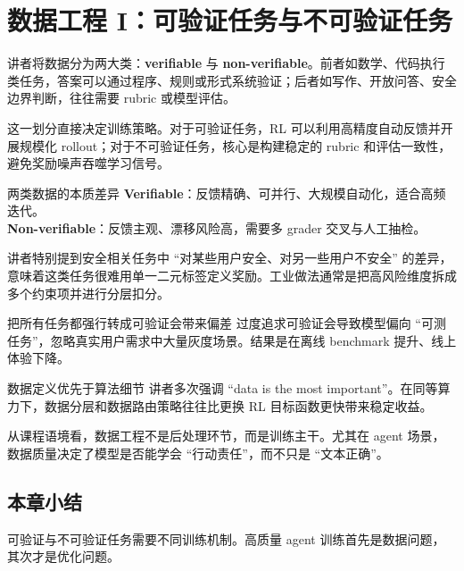 \section{数据工程 I：可验证任务与不可验证任务}

讲者将数据分为两大类：\textbf{verifiable} 与 \textbf{non-verifiable}。前者如数学、代码执行类任务，答案可以通过程序、规则或形式系统验证；后者如写作、开放问答、安全边界判断，往往需要 rubric 或模型评估。

这一划分直接决定训练策略。对于可验证任务，RL 可以利用高精度自动反馈并开展规模化 rollout；对于不可验证任务，核心是构建稳定的 rubric 和评估一致性，避免奖励噪声吞噬学习信号。

\begin{knowledgebox}{两类数据的本质差异}
\textbf{Verifiable}：反馈精确、可并行、大规模自动化，适合高频迭代。\\
\textbf{Non-verifiable}：反馈主观、漂移风险高，需要多 grader 交叉与人工抽检。
\end{knowledgebox}

讲者特别提到安全相关任务中 ``对某些用户安全、对另一些用户不安全'' 的差异，意味着这类任务很难用单一二元标签定义奖励。工业做法通常是把高风险维度拆成多个约束项并进行分层扣分。

\begin{warningbox}{把所有任务都强行转成可验证会带来偏差}
过度追求可验证会导致模型偏向 ``可测任务''，忽略真实用户需求中大量灰度场景。结果是在离线 benchmark 提升、线上体验下降。
\end{warningbox}

\begin{importantbox}{数据定义优先于算法细节}
讲者多次强调 ``data is the most important''。在同等算力下，数据分层和数据路由策略往往比更换 RL 目标函数更快带来稳定收益。
\end{importantbox}

从课程语境看，数据工程不是后处理环节，而是训练主干。尤其在 agent 场景，数据质量决定了模型是否能学会 ``行动责任''，而不只是 ``文本正确''。

\subsection{本章小结}
可验证与不可验证任务需要不同训练机制。高质量 agent 训练首先是数据问题，其次才是优化问题。


